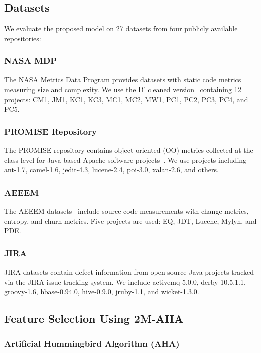 \documentclass[conference,twocolumn]{IEEEtran}
\begin{document}
\subsection{Datasets}

We evaluate the proposed model on 27 datasets from four publicly available repositories:

\subsubsection{NASA MDP}
The NASA Metrics Data Program provides datasets with static code metrics measuring size and complexity. We use the D' cleaned version~\cite{shepperd2013data} containing 12 projects: CM1, JM1, KC1, KC3, MC1, MC2, MW1, PC1, PC2, PC3, PC4, and PC5.

\subsubsection{PROMISE Repository}
The PROMISE repository contains object-oriented (OO) metrics collected at the class level for Java-based Apache software projects~\cite{jureczko2010using}. We use projects including ant-1.7, camel-1.6, jedit-4.3, lucene-2.4, poi-3.0, xalan-2.6, and others.

\subsubsection{AEEEM}
The AEEEM datasets~\cite{dambros2010extensive} include source code measurements with change metrics, entropy, and churn metrics. Five projects are used: EQ, JDT, Lucene, Mylyn, and PDE.

\subsubsection{JIRA}
JIRA datasets contain defect information from open-source Java projects tracked via the JIRA issue tracking system. We include activemq-5.0.0, derby-10.5.1.1, groovy-1.6, hbase-0.94.0, hive-0.9.0, jruby-1.1, and wicket-1.3.0.

\subsection{Feature Selection Using 2M-AHA}

\subsubsection{Artificial Hummingbird Algorithm (AHA)}
\end{document}
